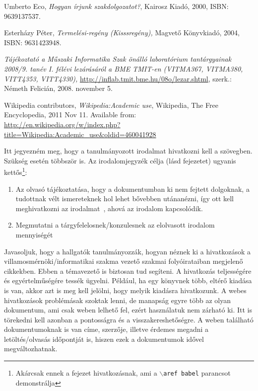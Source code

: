 \documentclass[a4paper,oneside]{article}
\begin{document}
\begin{thebibliography}{9}
\label{sec:tanulm-irod-jegyz}

 Umberto Eco, \emph{Hogyan írjunk szakdolgozatot?},
  Kairosz Kiadó, 2000, ISBN: 9639137537.

 Esterházy Péter, \emph{Termelési-regény (Kisssregény),}
  Magvető Könyvkiadó, 2004, ISBN: 9631423948.

 \emph{Tájékoztató a Műszaki Informatika Szak önálló
    laboratórium tantárgyainak 2008/9. tanév I. félévi lezárásáról a
    BME TMIT-en (VITMA367, VITMA380, VITT4353, VITT4330),}
  \url{http://inflab.tmit.bme.hu/08o/lezar.shtml}, szerk.: Németh Felicián,
  2008. november 5.

 Wikipedia contributors, \emph{Wikipedia:Academic
    use}, Wikipedia, The Free Encyclopedia, 2011 Nov 11.  Available
  from: \\ \url{http://en.wikipedia.org/w/index.php?title=Wikipedia:Academic\_use\&oldid=460041928}

\end{thebibliography}

Itt jegyezném meg, hogy a tanulmányozott irodalmat hivatkozni kell a
szövegben.  Szükség esetén többször is.  Az irodalomjegyzék célja
(lásd  fejezetet) ugyanis
kettős\footnote{Akárcsak ennek a fejezet hivatkozásnak, ami a
  \texttt{$\backslash$aref babel} parancsot demonstrálja}:
\begin{enumerate}
\item Az olvasó tájékoztatása, hogy a dokumentumban ki nem fejtett
  dolgoknak, a tudottnak vélt ismereteknek hol lehet bővebben
  utánanézni, így ott kell meghivatkozni az irodalmat~\cite{eco,
    esterhazy}, ahová az irodalom kapcsolódik.
\item Megmutatni a tárgyfelelosnek/konzulesnek az elolvasott irodalom
  mennyiségét
\end{enumerate}

Javasoljuk, hogy a hallgatók tanulmányozzák, hogyan néznek ki a
hivatkozások a villamosmérnöki/informatikai szakma vezető szakmai
folyóirataiban megjelenő cikkekben.  Ebben a témavezető is biztosan
tud segíteni.  A hivatkozás teljességére és egyértelműségére tessék
ügyelni.  Például, ha egy könyvnek több, eltérő kiadása is van, akkor
azt is meg kell jelölni, hogy melyik kiadásra hivatkozunk.  A webes
hivatkozások problémásak szoktak lenni, de manapság egyre több az
olyan dokumentum, ami csak weben lelhető fel, ezért használatuk nem
zárható ki. Itt is törekedni kell azonban a pontosságra és a
visszakereshetőségre. A weben található dokumentumoknak is van címe,
szerzője, illetve érdemes megadni a letöltés/olvasás időpontját is,
hiszen ezek a dokumentumok idővel megváltozhatnak.
\end{document}
